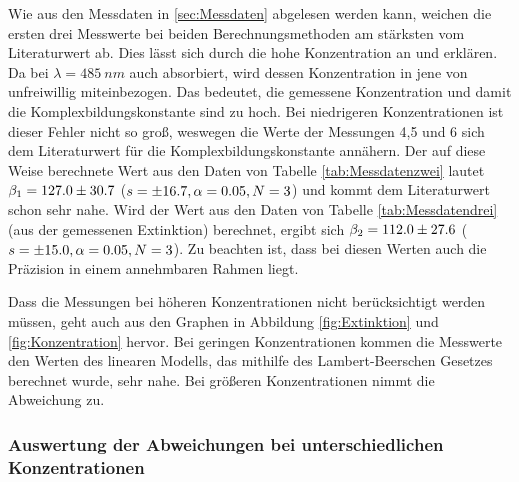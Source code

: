 \documentclass{article}
\begin{document}
    Wie aus den Messdaten in \ref{sec:Messdaten} abgelesen werden kann, weichen die ersten drei Messwerte bei beiden Berechnungsmethoden am stärksten vom Literaturwert ab. Dies lässt sich durch die hohe Konzentration an \ch{[Fe(OH2)5SCN]\pch[2]} und  erklären. Da  bei $\lambda = \SI[mode=text]{485}{nm}$ auch absorbiert, wird dessen Konzentration in jene von \ch{[Fe(OH2)5SCN]\pch[2]} unfreiwillig miteinbezogen. Das bedeutet, die gemessene \ch{[Fe(OH2)5SCN]\pch[2]} Konzentration und damit die Komplexbildungskonstante sind zu hoch. Bei niedrigeren  Konzentrationen ist dieser Fehler nicht so groß, weswegen die Werte der Messungen 4,5 und 6 sich dem Literaturwert für die Komplexbildungskonstante annähern. Der auf diese Weise berechnete Wert aus den Daten von Tabelle \ref{tab:Messdatenzwei} lautet $\beta_{1} = \num[separate-uncertainty]{127 \pm 30.7}$ ($s=\num{\pm 16.7},\alpha=0.05,N=3$) und kommt dem Literaturwert schon sehr nahe. Wird der Wert aus den Daten von Tabelle \ref{tab:Messdatendrei} (aus der gemessenen Extinktion) berechnet, ergibt sich $\beta_{2} = \num[separate-uncertainty]{112 \pm 27.6}$ ($s=\num{\pm 15.0},\alpha=0.05,N=3$). Zu beachten ist, dass bei diesen Werten auch die Präzision in einem annehmbaren Rahmen liegt.
    
    Dass die Messungen bei höheren Konzentrationen nicht berücksichtigt werden müssen, geht auch aus den Graphen in Abbildung \ref{fig:Extinktion} und \ref{fig:Konzentration} hervor. Bei geringen Konzentrationen kommen die Messwerte den Werten des linearen Modells, das mithilfe des Lambert-Beerschen Gesetzes berechnet wurde, sehr nahe. Bei größeren Konzentrationen nimmt die Abweichung zu.
    
    \subsubsection{Auswertung der Abweichungen bei unterschiedlichen Konzentrationen}
    
\end{document}
